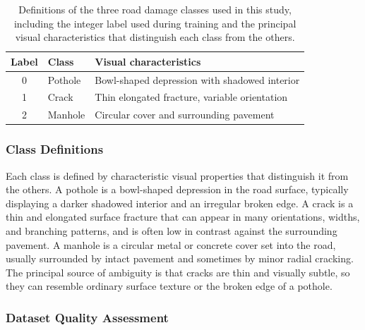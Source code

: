\documentclass[preprint,12pt]{elsarticle}
\begin{document}
\begin{table}[!ht]
\centering
\caption{Definitions of the three road damage classes used in this study, including the integer label used during training and the principal visual characteristics that distinguish each class from the others.}
\label{tab:classes}
\begin{tabular}{cll}
\toprule
\textbf{Label} & \textbf{Class} & \textbf{Visual characteristics} \\
\midrule
0 & Pothole & Bowl-shaped depression with shadowed interior \\
1 & Crack   & Thin elongated fracture, variable orientation \\
2 & Manhole & Circular cover and surrounding pavement \\
\bottomrule
\end{tabular}
\end{table}

\subsubsection{Class Definitions}

Each class is defined by characteristic visual properties that distinguish it from the others.
A pothole is a bowl-shaped depression in the road surface, typically displaying a darker shadowed interior and an irregular broken edge.
A crack is a thin and elongated surface fracture that can appear in many orientations, widths, and branching patterns, and is often low in contrast against the surrounding pavement.
A manhole is a circular metal or concrete cover set into the road, usually surrounded by intact pavement and sometimes by minor radial cracking.
The principal source of ambiguity is that cracks are thin and visually subtle, so they can resemble ordinary surface texture or the broken edge of a pothole.

\subsubsection{Dataset Quality Assessment}
\end{document}
